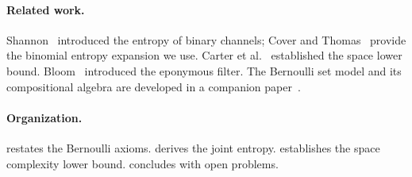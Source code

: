 \paragraph{Related work.}
Shannon~\cite{shannonBSC} introduced the entropy of binary channels; Cover and
Thomas~\cite{coverThomas} provide the binomial entropy expansion we use.
Carter et al.~\cite{carterExact} established the space lower bound.
Bloom~\cite{bf} introduced the eponymous filter.
The Bernoulli set model and its compositional algebra are developed in a
companion paper~\cite{bernoulliSets}.

\paragraph{Organization.}
 restates the Bernoulli axioms.
 derives the joint entropy.
 establishes the space complexity lower bound.
 concludes with open problems.
